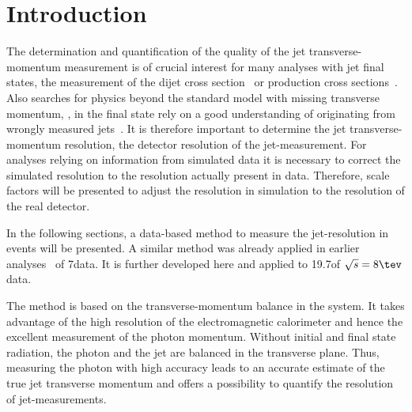 \chapter{Introduction}
\label{res:ch:Introduction}

The determination and quantification of the quality of the jet transverse-momentum measurement is of crucial interest for many analyses with jet final states, \eg the measurement of the dijet cross section~\cite{bib:CMS:QCD_measurements} or \ttbar production cross sections~\cite{bib:CMS:TopCrossSection_8TeV}. 
Also searches for physics beyond the standard model with missing transverse momentum, \PTm, in the final state rely on a good understanding of \PTm originating from wrongly measured jets~\cite{bib:CMS:RA2_8TeV,bib:CMS:MT2_8TeV,bib:CMS:AlphaT_8TeV}.
It is therefore important to determine the jet transverse-momentum resolution, \ie the detector resolution of the jet-\pt measurement.
For analyses relying on information from simulated data it is necessary to correct the simulated resolution to the resolution actually present in data.
Therefore, scale factors will be presented to adjust the resolution in simulation to the resolution of the real detector.  
  
In the following sections, a data-based method to measure the jet-\pt resolution in \GAMJET events will be presented. 
A similar method was already applied in earlier analyses~\cite{bib:CMS:JERCPaper_2011,CMS:PAS:JETResolution_7TeV} of 7\tev data.  
It is further developed here and applied to 19.7\fbinv of $\sqrt{s}=8\tev$ data.

The method is based on the transverse-momentum balance in the \GAMJET system. 
It takes advantage of the high resolution of the electromagnetic calorimeter and hence the excellent measurement of the photon momentum.
Without initial and final state radiation, the photon and the jet are balanced in the transverse plane. 
Thus, measuring the photon \pt with high accuracy leads to an accurate estimate of the true jet transverse momentum and offers a possibility to quantify the resolution of jet-\pt measurements.


